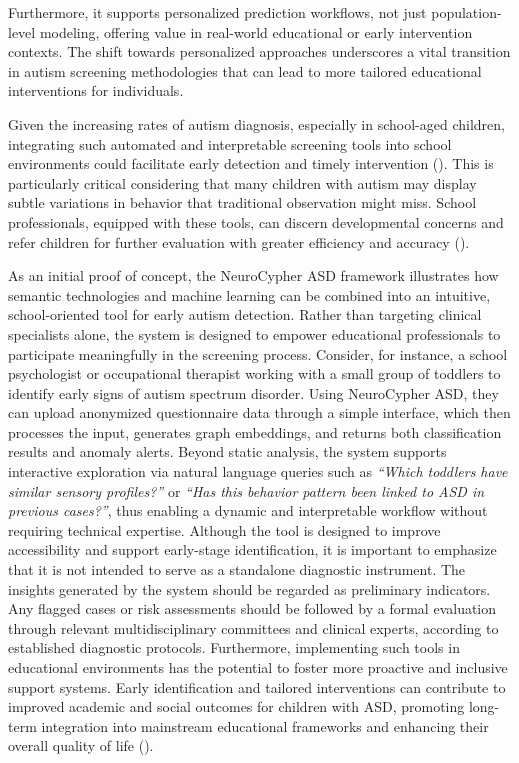 \documentclass[pdflatex,sn-basic]{sn-jnl}%
\theoremstyle{thmstyleone}%
\theoremstyle{thmstyletwo}%
\theoremstyle{thmstylethree}%
\begin{document}
  Furthermore, it supports personalized prediction workflows, not just population-level modeling, offering value in real-world
  educational or early intervention contexts. The shift towards personalized approaches underscores a vital transition in autism
  screening methodologies that can lead to more tailored educational interventions for individuals.

  Given the increasing rates of autism diagnosis, especially in school-aged children, integrating such automated and
  interpretable screening tools into school environments could facilitate early detection and timely intervention (\cite{10.1001/
  jamanetworkopen.2022.54303, 10.4103/ijmr.ijmr_1968_16}). This is particularly critical considering that many children with
  autism may display subtle variations in behavior that traditional observation might miss. School professionals, equipped with
  these tools, can discern developmental concerns and refer children for further evaluation with greater efficiency and accuracy
  (\cite{10.3390/app6070200, 10.1001/jamapediatrics.2023.5727}).

  As an initial proof of concept, the NeuroCypher ASD framework illustrates how semantic technologies and machine learning can be
  combined into an intuitive, school-oriented tool for early autism detection. Rather than targeting clinical specialists alone,
  the system is designed to empower educational professionals to participate meaningfully in the screening process. Consider, for
  instance, a school psychologist or occupational therapist working with a small group of toddlers to identify early signs of
  autism spectrum disorder. Using NeuroCypher ASD, they can upload anonymized questionnaire data through a simple interface,
  which then processes the input, generates graph embeddings, and returns both classification results and anomaly alerts. Beyond
  static analysis, the system supports interactive exploration via natural language queries such as \textit{“Which toddlers have
  similar sensory profiles?”} or \textit{“Has this behavior pattern been linked to ASD in previous cases?”}, thus enabling a
  dynamic and interpretable workflow without requiring technical expertise. Although the tool is designed to improve
  accessibility and support early-stage identification, it is important to emphasize that it is not intended to serve as a
  standalone diagnostic instrument. The insights generated by the system should be regarded as preliminary indicators. Any
  flagged cases or risk assessments should be followed by a formal evaluation through relevant multidisciplinary committees and
  clinical experts, according to established diagnostic protocols. Furthermore, implementing such tools in educational
  environments has the potential to foster more proactive and inclusive support systems. Early identification and tailored
  interventions can contribute to improved academic and social outcomes for children with ASD, promoting long-term integration
  into mainstream educational frameworks and enhancing their overall quality of life (\cite{10.1002/aur.2033}).
\end{document}
